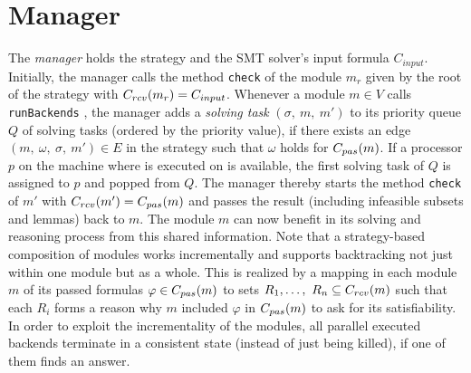 \section{Manager}
The \emph{manager} holds the strategy and the SMT solver's input formula $C_{input}$. Initially, the manager calls the method \texttt{check} of the module $m_r$ given by the root of the strategy with $C_{rcv}(m_r) = C_{input}$. Whenever a module $m\in V$ calls \texttt{runBackends}%
, the manager adds a \emph{solving task} $(\sigma,\ m,\ m')$ to its priority queue $Q$ of solving tasks (ordered by the priority value), if there exists an edge $(m,\ \omega,\ \sigma,\ m')\in E$  in the strategy such that $\omega$ holds for $C_{pas}(m)$. If a processor $p$ on the machine where \smtrat is executed on is available, the first solving task of $Q$ is assigned to $p$ and popped from $Q$. The manager thereby starts the method \texttt{check} of $m'$ with $C_{rcv}(m') = C_{pas}(m)$ and passes the result (including infeasible subsets and lemmas) back to $m$. The module $m$ can now benefit in its solving and reasoning process from this shared information. Note that a strategy-based composition of modules works incrementally and supports backtracking not just within one module but as a whole. This is realized by a mapping in each module $m$ of its passed formulas $\varphi\in C_{pas}(m)$ to sets $R_1,\ldots,\ R_n \subseteq C_{rcv}(m)$ such that each $R_i$ forms a reason why $m$ included $\varphi$ in $C_{pas}(m)$ to ask for its satisfiability. In order to exploit the incrementality of the modules, all parallel executed backends terminate in a consistent state (instead of just being killed), if one of them finds an answer.
  
